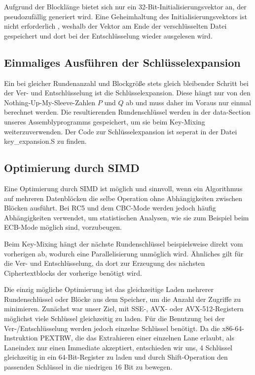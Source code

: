 \documentclass[course=erap]{aspdoc}
\begin{document}
Aufgrund der Blocklänge bietet sich nur ein 32-Bit-Initialisierungsvektor an, der pseudozufällig generiert wird.
Eine Geheimhaltung des Initialisierungsvektors ist nicht erforderlich \cite[p.194]{appcrypt}, weshalb der Vektor am Ende der verschlüsselten Datei gespeichert und dort bei der Entschlüsselung wieder ausgelesen wird.

\subsection{Einmaliges Ausführen der Schlüsselexpansion}
Ein bei gleicher Rundenanzahl und Blockgröße stets gleich bleibender Schritt bei der Ver- und Entschlüsselung ist die Schlüsselexpansion. Diese hängt nur von den Nothing-Up-My-Sleeve-Zahlen $P$ und $Q$ ab und muss daher im Voraus nur einmal berechnet werden. Die resultierenden Rundenschlüssel werden in der data-Section unseres Assemblyprogramms gespeichert, um sie beim Key-Mixing weiterzuverwenden. Der Code zur Schlüsselexpansion ist seperat in der Datei key\_expansion.S zu finden.

\subsection{Optimierung durch SIMD}
Eine Optimierung durch SIMD ist möglich und sinnvoll, wenn ein Algorithmus auf mehreren Datenblöcken die selbe Operation ohne Abhängigkeiten zwischen Blöcken ausführt. Bei RC5 und dem CBC-Mode werden jedoch häufig Abhängigkeiten verwendet, um statistischen Analysen, wie sie zum Beispiel beim ECB-Mode möglich sind, vorzubeugen.\bigbreak

Beim Key-Mixing hängt der nächste Rundenschlüssel beispielsweise direkt vom vorherigen ab, wodurch eine Parallelisierung unmöglich wird.
Ähnliches gilt für die Ver- und Entschlüsselung, da dort zur Erzeugung des nächsten Ciphertextblocks der vorherige benötigt wird.\bigbreak

Die einzig mögliche Optimierung ist das gleichzeitige Laden mehrerer Rundenschlüssel oder Blöcke aus dem Speicher, um die Anzahl der Zugriffe zu minimieren. Zunächst war unser Ziel, mit SSE-, AVX- oder AVX-512-Registern möglichst viele Schlüssel gleichzeitig zu laden. Für die Benutzung bei der Ver-/Entschlüsselung werden jedoch einzelne Schlüssel benötigt. Da die x86-64-Instruktion PEXTRW, die das Extrahieren einer einzelnen Lane erlaubt, als Laneindex nur einen Immediate akzeptiert, entschieden wir uns, 4 Schlüssel gleichzeitig in ein 64-Bit-Register zu laden und durch Shift-Operation den passenden Schlüssel in die niedrigen 16 Bit zu bewegen.
\end{document}
